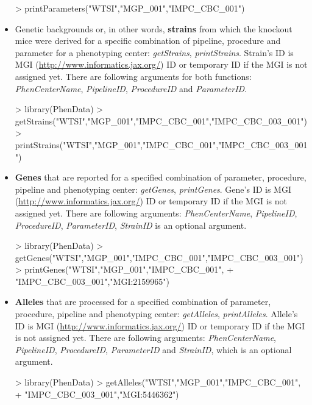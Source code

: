 \documentclass[a4paper]{article}
\begin{document}
\begin{itemize}
\begin{Schunk}
\begin{Sinput}
> printParameters("WTSI","MGP_001","IMPC_CBC_001")
\end{Sinput}
\end{Schunk}
\item Genetic backgrounds or, in other words, \textbf{strains} from which the knockout mice were derived for a specific combination of pipeline, procedure and parameter for a phenotyping center: \textit{getStrains}, \textit{printStrains}. Strain's ID is MGI (\url{http://www.informatics.jax.org/}) ID or temporary ID if the MGI is not assigned yet.  There are following arguments for both functions: \textit{PhenCenterName}, \textit{PipelineID}, \textit{ProcedureID} and \textit{ParameterID}.
\begin{Schunk}
\begin{Sinput}
> library(PhenData)
> getStrains("WTSI","MGP_001","IMPC_CBC_001","IMPC_CBC_003_001")
> printStrains("WTSI","MGP_001","IMPC_CBC_001","IMPC_CBC_003_001")
\end{Sinput}
\end{Schunk}
\item \textbf{Genes} that are reported for a specified combination of parameter, procedure, pipeline and phenotyping center: \textit{getGenes}, \textit{printGenes}. Gene's ID is MGI (\url{http://www.informatics.jax.org/}) ID or temporary ID if the MGI is not assigned yet. There are following arguments: \textit{PhenCenterName}, \textit{PipelineID}, \textit{ProcedureID}, \textit{ParameterID}, \textit{StrainID} is an optional argument.
\begin{Schunk}
\begin{Sinput}
> library(PhenData)
> getGenes("WTSI","MGP_001","IMPC_CBC_001","IMPC_CBC_003_001")
> printGenes("WTSI","MGP_001","IMPC_CBC_001",
+ "IMPC_CBC_003_001","MGI:2159965")
\end{Sinput}
\end{Schunk}
\item \textbf{Alleles} that are processed for a specified combination of parameter, procedure, pipeline and phenotyping center: \textit{getAlleles}, \textit{printAlleles}. Allele's ID is MGI (\url{http://www.informatics.jax.org/}) ID or temporary ID if the MGI is not assigned yet. There are following arguments: \textit{PhenCenterName}, \textit{PipelineID}, \textit{ProcedureID}, \textit{ParameterID} and \textit{StrainID}, which is an optional argument.
\begin{Schunk}
\begin{Sinput}
> library(PhenData)
> getAlleles("WTSI","MGP_001","IMPC_CBC_001",
+ "IMPC_CBC_003_001","MGI:5446362")

\end{Sinput}
\end{Schunk}
\end{itemize}
\end{document}
